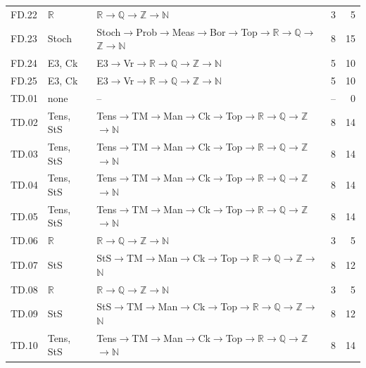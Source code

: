 {\begin{longtable}{l p{4.6cm} p{7.4cm} r r}
FD.22 & $\mathbb R$ & $\mathbb R$$\to$$\mathbb Q$$\to$$\mathbb Z$$\to$$\mathbb N$ & 3 & 5 \\
FD.23 & \textsf{Stoch} & \textsf{Stoch}$\to$\textsf{Prob}$\to$\textsf{Meas}$\to$\textsf{Bor}$\to$\textsf{Top}$\to$$\mathbb R$$\to$$\mathbb Q$$\to$$\mathbb Z$$\to$$\mathbb N$ & 8 & 15 \\
FD.24 & \textsf{E3}, \textsf{Ck} & \textsf{E3}$\to$\textsf{Vr}$\to$$\mathbb R$$\to$$\mathbb Q$$\to$$\mathbb Z$$\to$$\mathbb N$ & 5 & 10 \\
FD.25 & \textsf{E3}, \textsf{Ck} & \textsf{E3}$\to$\textsf{Vr}$\to$$\mathbb R$$\to$$\mathbb Q$$\to$$\mathbb Z$$\to$$\mathbb N$ & 5 & 10 \\
TD.01 & none & -- & -- & 0 \\
TD.02 & \textsf{Tens}, \textsf{StS} & \textsf{Tens}$\to$\textsf{TM}$\to$\textsf{Man}$\to$\textsf{Ck}$\to$\textsf{Top}$\to$$\mathbb R$$\to$$\mathbb Q$$\to$$\mathbb Z$$\to$$\mathbb N$ & 8 & 14 \\
TD.03 & \textsf{Tens}, \textsf{StS} & \textsf{Tens}$\to$\textsf{TM}$\to$\textsf{Man}$\to$\textsf{Ck}$\to$\textsf{Top}$\to$$\mathbb R$$\to$$\mathbb Q$$\to$$\mathbb Z$$\to$$\mathbb N$ & 8 & 14 \\
TD.04 & \textsf{Tens}, \textsf{StS} & \textsf{Tens}$\to$\textsf{TM}$\to$\textsf{Man}$\to$\textsf{Ck}$\to$\textsf{Top}$\to$$\mathbb R$$\to$$\mathbb Q$$\to$$\mathbb Z$$\to$$\mathbb N$ & 8 & 14 \\
TD.05 & \textsf{Tens}, \textsf{StS} & \textsf{Tens}$\to$\textsf{TM}$\to$\textsf{Man}$\to$\textsf{Ck}$\to$\textsf{Top}$\to$$\mathbb R$$\to$$\mathbb Q$$\to$$\mathbb Z$$\to$$\mathbb N$ & 8 & 14 \\
TD.06 & $\mathbb R$ & $\mathbb R$$\to$$\mathbb Q$$\to$$\mathbb Z$$\to$$\mathbb N$ & 3 & 5 \\
TD.07 & \textsf{StS} & \textsf{StS}$\to$\textsf{TM}$\to$\textsf{Man}$\to$\textsf{Ck}$\to$\textsf{Top}$\to$$\mathbb R$$\to$$\mathbb Q$$\to$$\mathbb Z$$\to$$\mathbb N$ & 8 & 12 \\
TD.08 & $\mathbb R$ & $\mathbb R$$\to$$\mathbb Q$$\to$$\mathbb Z$$\to$$\mathbb N$ & 3 & 5 \\
TD.09 & \textsf{StS} & \textsf{StS}$\to$\textsf{TM}$\to$\textsf{Man}$\to$\textsf{Ck}$\to$\textsf{Top}$\to$$\mathbb R$$\to$$\mathbb Q$$\to$$\mathbb Z$$\to$$\mathbb N$ & 8 & 12 \\
TD.10 & \textsf{Tens}, \textsf{StS} & \textsf{Tens}$\to$\textsf{TM}$\to$\textsf{Man}$\to$\textsf{Ck}$\to$\textsf{Top}$\to$$\mathbb R$$\to$$\mathbb Q$$\to$$\mathbb Z$$\to$$\mathbb N$ & 8 & 14 \\

\end{longtable}}
